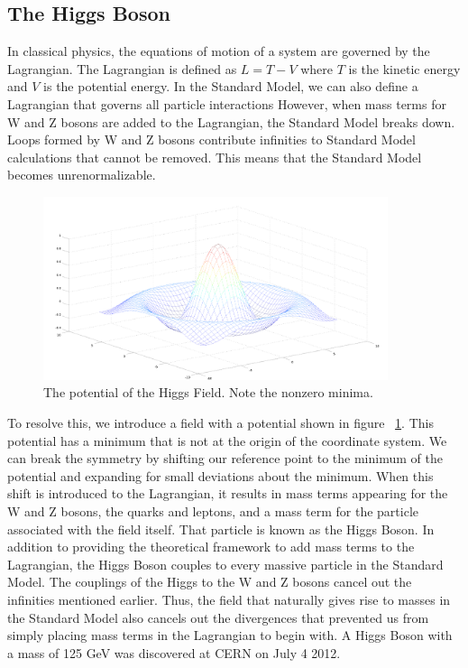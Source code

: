 \documentclass[oneside, letterpaper, oldfontcommands]{memoir}
\begin{document}
\subsection{The Higgs Boson}\label{higgstheory}
\qquad In classical physics, the equations of motion of a system are governed by the Lagrangian. The Lagrangian is defined as $L = T - V$ where $T$ is the kinetic energy and $V$ is the potential energy. In the Standard Model, we can also define a Lagrangian that governs all particle interactions\cite{Halzen:1984mc} However, when mass terms for W and Z bosons are added to the Lagrangian, the Standard Model breaks down. Loops formed by W and Z bosons contribute infinities to Standard Model calculations that cannot be removed. This means that the Standard Model becomes unrenormalizable. 

\begin{figure}[here]
\includegraphics[width=0.9\textwidth]{HiggsPotential.png}
\caption{The potential of the Higgs Field. Note the nonzero minima.}
\label{fig:HiggsPotential}
\end{figure}

\qquad To resolve this, we introduce a field with a potential shown in figure ~\ref{fig:HiggsPotential}. This potential has a minimum that is not at the origin of the coordinate system. We can break the symmetry by shifting our reference point to the minimum of the potential and expanding for small deviations about the minimum. When this shift is introduced to the Lagrangian, it results in mass terms appearing for the W and Z bosons, the quarks and leptons, and a mass term for the particle associated with the field itself. That particle is known as the Higgs Boson. In addition to providing the theoretical framework to add mass terms to the Lagrangian, the Higgs Boson couples to every massive particle in the Standard Model. The couplings of the Higgs to the W and Z bosons cancel out the infinities mentioned earlier.\cite{Halzen:1984mc} Thus, the field that naturally gives rise to masses in the Standard Model also cancels out the divergences that prevented us from simply placing mass terms in the Lagrangian to begin with. A Higgs Boson with a mass of 125 GeV was discovered at CERN on July 4 2012. \cite{Agashe:2014kda}
 
\end{document}
